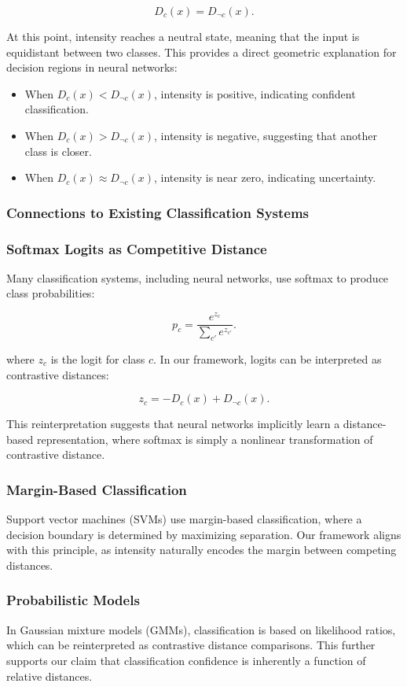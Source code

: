 \[
D_c(x) = D_{\neg c}(x).
\]

At this point, intensity reaches a neutral state, meaning that the input is equidistant between two classes. This provides a direct geometric explanation for decision regions in neural networks: 

\begin{itemize}
    \item When \( D_c(x) < D_{\neg c}(x) \), intensity is positive, indicating confident classification.
    \item When \( D_c(x) > D_{\neg c}(x) \), intensity is negative, suggesting that another class is closer.
    \item When \( D_c(x) \approx D_{\neg c}(x) \), intensity is near zero, indicating uncertainty.
\end{itemize}

\subsubsection{Connections to Existing Classification Systems}

\subsubsection{Softmax Logits as Competitive Distance}
Many classification systems, including neural networks, use softmax to produce class probabilities:

\[
p_c = \frac{e^{z_c}}{\sum_{c'} e^{z_{c'}}}.
\]

where \( z_c \) is the logit for class \( c \). In our framework, logits can be interpreted as contrastive distances:

\[
z_c = -D_c(x) + D_{\neg c}(x).
\]

This reinterpretation suggests that neural networks implicitly learn a distance-based representation, where softmax is simply a nonlinear transformation of contrastive distance.

\subsubsection{Margin-Based Classification}
Support vector machines (SVMs) use margin-based classification, where a decision boundary is determined by maximizing separation. Our framework aligns with this principle, as intensity naturally encodes the margin between competing distances.

\subsubsection{Probabilistic Models}
In Gaussian mixture models (GMMs), classification is based on likelihood ratios, which can be reinterpreted as contrastive distance comparisons. This further supports our claim that classification confidence is inherently a function of relative distances.

